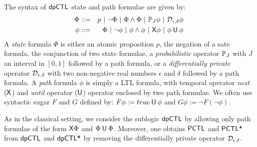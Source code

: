 
The syntax of $\textsf{dpCTL}$ state and path formulae are given by:
\begin{eqnarray*}
  \Phi & ::= & p \ |\ \neg \Phi \ |\ \Phi \wedge \Phi \ |\
               \PJ{J} \phi \ |\ \dpriv{\epsilon}{\delta} \phi\\
  \phi & ::= & \Phi \ |\ \neg\phi  \ |\  \phi\wedge\phi  \ |\  \X \phi \ |\ \phi \until \phi
\end{eqnarray*}
A \emph{state} formula $\Phi$ is either  an atomic proposition
$p$, the negation of a sate formula, the conjunction of two state
formulae, a \emph{probabilistic} operator $\mathbb{P}_{J}$ with $J$
an interval in $[0, 1]$ followed by a path formula, or a
\emph{differentially private} operator $\mathcal{D}_{{\epsilon}, {\delta}}$
 with two non-negative real numbers $\epsilon$ and $\delta$ followed
 by a path formula. A
\emph{path} formula $\phi$ is simply a LTL formula, with temporal operator \emph{next}  ($\mathsf{X}$)
and  \emph{until} operator
($\mathbin{\mathsf{U}}$) operator enclosed by two path formulae.
We often use syntactic sugar $F$ and $G$ defined by: $F \phi:= true \mathbin{\mathsf{U}} \phi$ and $G\phi :=\neg F (\neg\phi)$.

As in the classical setting, we consider the sublogic $\textsf{dpCTL}$ by allowing only path formulae of the form $\mathsf{X}\Phi$ and $\Phi\mathbin{\mathsf{U}}\Phi$.
Moreover, one obtains $\textsf{PCTL}$ and $\textsf{PCTL*}$ from $\textsf{dpCTL}$ and $\textsf{dpCTL*}$
by removing the differentially private operator  $\mathcal{D}_{{\epsilon}, {\delta}}$. 

